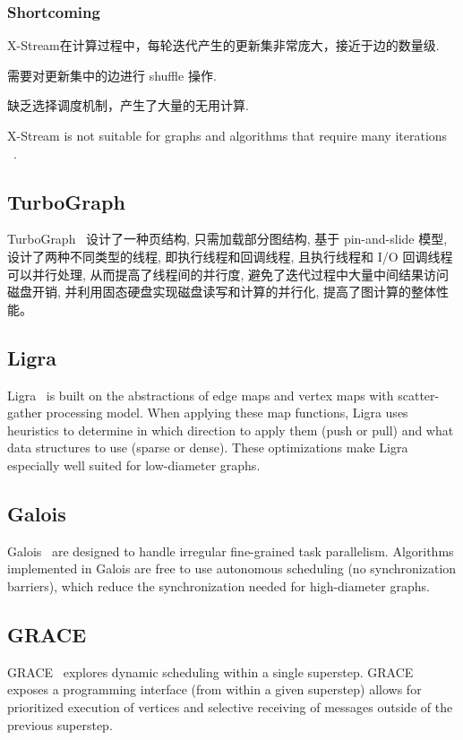 \documentclass[UTF8,12pt,a4paper]{article}
\begin{document}
\subsubsection{Shortcoming}
\begin{compactitem}
  \item X-Stream在计算过程中，每轮迭代产生的更新集非常庞大，接近于边的数量级.
  \item 需要对更新集中的边进行 shuffle 操作.
  \item 缺乏选择调度机制，产生了大量的无用计算.
  \item X-Stream is not suitable for graphs and algorithms that require many iterations
  ~\cite{DBLP:conf/sc/YuanZXJLL14}.
\end{compactitem}

\subsection{TurboGraph}
TurboGraph~\cite{DBLP:conf/kdd/HanLPL0KY13}
设计了一种页结构, 只需加载部分图结构, 基于 pin-and-slide 模型,
设计了两种不同类型的线程, 即执行线程和回调线程,
且执行线程和 I/O 回调线程可以并行处理, 从而提高了线程间的并行度,
避免了迭代过程中大量中间结果访问磁盘开销,
并利用固态硬盘实现磁盘读写和计算的并行化, 提高了图计算的整体性能。

\subsection{Ligra}
Ligra~\cite{DBLP:conf/ppopp/ShunB13} is built on
the abstractions of edge maps and vertex maps
with scatter-gather processing model.
When applying these map functions,
Ligra uses heuristics to determine in
which direction to apply them (push or pull)
and what data structures to use (sparse or dense).
These optimizations make Ligra especially well suited for low-diameter graphs.

\subsection{Galois}
Galois~\cite{DBLP:conf/sosp/NguyenLP13}
are designed to handle irregular fine-grained task parallelism.
Algorithms implemented in Galois
are free to use autonomous scheduling (no synchronization barriers),
which reduce the synchronization needed for high-diameter graphs.

\subsection{GRACE}
GRACE~\cite{DBLP:conf/cidr/WangXDG13}
explores dynamic scheduling within a single superstep.
GRACE exposes a programming interface (from within a given superstep)
allows for prioritized execution of vertices and
selective receiving of messages outside of the previous superstep.
\end{document}
